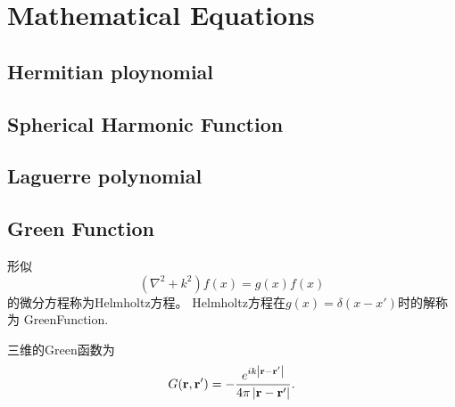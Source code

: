 \chapter{Mathematical Equations}
\section{Hermitian ploynomial}
\label{Hermition_Polynomial}
\section{Spherical Harmonic Function}
\label{SphereHarmonic_Function}
\section{Laguerre polynomial}
\label{Laguerre_Polynomial}
\section{Green Function}
\label{Green_Function}

形似
\begin{equation}
    (\nabla^2+k^2)f(x)=g(x)f(x)
\end{equation}
的微分方程称为Helmholtz方程。 Helmholtz方程在$g(x)=\delta(x-x')$时的解称为 \gls{GreenFunction}.

三维的Green函数为
\begin{equation}
    G(\mathbf{r},\mathbf{r}')=-\frac{e^{ik\left|\mathbf{r}-\mathbf{r}'\right|}}{4\pi\left|\mathbf{r}-\mathbf{r}'\right|}.
\end{equation}

